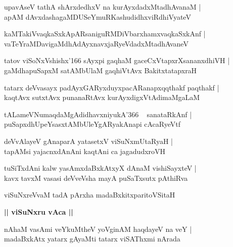 \documentclass[twoside,12pt,openright]{book}
\newcounter{shloka}[chapter]
\def\uvaca#1{\centerline{{\large\textbf{#1}}}}
\begin{document}
\begin{shloka}%
upavAseV tathA shArxdedhxV na kurAyxdadxMtadhAvanaM |\\
apAM dAvxdashagaMDUSeYmuRKashudidhxviRdhiVyateV 
\end{shloka}

\begin{shloka}%
kaMTakiVvaqkaSxkApARsaniguRMDiVbarxhamxvaqkaSxkAnf |\\
vaTeYraMDavigaMdhAdAyxnavxjaRyeVdadxMtadhAvaneV 
\end{shloka}

\begin{shloka}%
tatov viSoNxVshishx\char'166 sAyxpi gaqhaM gaceCxVtapxrXsananxdhiVH |\\
gaMdhapuSapxM satAMbUlaM gaqhiVtAvx BakitxtatapxraH 
\end{shloka}

\begin{shloka}%
tatarx deVvasayx padAyxGARyxduyxpacARanapxqqthakf paqthakf |\\
kaqtAvx sutxtAvx punanaRtAvx kurAyxdigxVtAdimaMgaLaM 
\end{shloka}

\begin{shloka}%
tALameVNumaqdaMgAdidhavxniyukA\char'366 ~ sanataRkAnf |\\
puSapxdhUpeYsasxtAMbUleYgARyakAnapi cAcaRyeVtf 
\end{shloka}

\begin{shloka}%
deVvAlayeV gAnaparA yatasetxV viSuNxmUtaRyaH |\\
tapAMsi yajacnxdAnAni kaqtAni ca jagadudxroVH 
\end{shloka}

\begin{shloka}%
tuSiTxdAni kalw yasAmxdaBxkAtxyX dAnaM vishiSayxteV |\\
kavx tavxM vasasi deVveVsha mayA puSaTxsutx pAthiRva
\end{shloka}

\begin{shloka}%
viSuNxreVvaM tadA pArxha madaBxkitxparitoVSitaH \\
\end{shloka}

\uvaca{|| viSuNxru vAca ||}

\begin{shloka}%
nAhaM vasAmi veYkuMtheV yoVginAM haqdayeV na veY |\\
madaBxkAtx yatarx gAyaMti tatarx viSAThxmi nArada 
\end{shloka}
\end{document}
